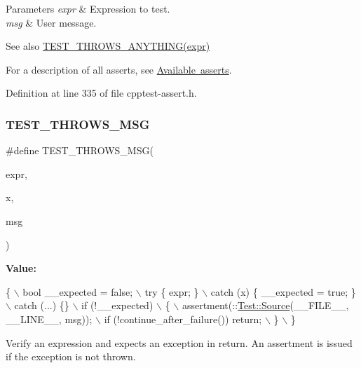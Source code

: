 \begin{DoxyParams}{Parameters}
{\em expr} & Expression to test. \\
\hline
{\em msg} & User message.\\
\hline
\end{DoxyParams}
\begin{DoxySeeAlso}{See also}
\mbox{\hyperlink{cpptest-assert_8h_a895af88056cd626a010136ac07b81d37}{T\+E\+S\+T\+\_\+\+T\+H\+R\+O\+W\+S\+\_\+\+A\+N\+Y\+T\+H\+I\+N\+G(expr)}}
\end{DoxySeeAlso}
For a description of all asserts, see \mbox{\hyperlink{asserts}{Available asserts}}. 

Definition at line 335 of file cpptest-\/assert.\+h.

\mbox{\label{cpptest-assert_8h_a1ce6abe9e9134ce993840a648673e0f2}} 
\subsubsection{\texorpdfstring{T\+E\+S\+T\+\_\+\+T\+H\+R\+O\+W\+S\+\_\+\+M\+SG}{TEST\_THROWS\_MSG}}
{\footnotesize\ttfamily \#define T\+E\+S\+T\+\_\+\+T\+H\+R\+O\+W\+S\+\_\+\+M\+SG(\begin{DoxyParamCaption}\item[{}]{expr,  }\item[{}]{x,  }\item[{}]{msg }\end{DoxyParamCaption})}

{\bfseries Value\+:}
\begin{DoxyCode}
\{                                                               \(\backslash\)
        bool \_\_expected = \textcolor{keyword}{false};                                    \(\backslash\)
        try \{ expr; \}                                               \(\backslash\)
        catch (x)           \{ \_\_expected = \textcolor{keyword}{true}; \}                  \(\backslash\)
        catch (...)         \{\}                                      \(\backslash\)
        if (!\_\_expected)                                            \(\backslash\)
        \{                                                           \(\backslash\)
            assertment(::\mbox{\hyperlink{class_test_1_1_source}{Test::Source}}(\_\_FILE\_\_, \_\_LINE\_\_, msg));    \(\backslash\)
            if (!continue\_after\_failure()) return;                  \(\backslash\)
        \}                                                           \(\backslash\)
    \}
\end{DoxyCode}
Verify an expression and expects an exception in return. An assertment is issued if the exception is not thrown.

